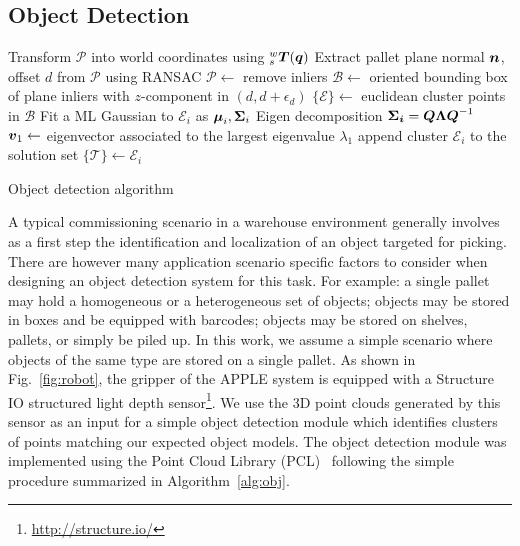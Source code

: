\subsection{Object Detection}
\label{subsec:obj_det}
%
%
\begin{algorithm}[t!]
{}
Transform $\mathcal{P}$ into world coordinates using $^w_s\mbox{\boldmath $T$}(\mbox{\boldmath $q$})$\;
 {
    Extract pallet plane normal $\mbox{\boldmath $n$}$, offset $d$ from $\mathcal{P}$ using RANSAC\;
     {$\mathcal{P} \leftarrow$ remove inliers\; }
}
$\mathcal{B} \leftarrow$ oriented bounding box of plane inliers with $z$-component in $(d,d+\epsilon_d)$\;
$\{\mathcal{E}\} \leftarrow$ euclidean cluster points in $\mathcal{B}$\;
 {
    Fit a ML Gaussian to $\mathcal{E}_i$ as $\mbox{\boldmath $\mu$}_i,\mbox{\boldmath $\Sigma$}_i$\;
    Eigen decomposition $\mbox{\boldmath $\Sigma_i$}=\mbox{\boldmath $Q$}\mbox{\boldmath $\Lambda$}\mbox{\boldmath $Q$}^{-1}$\;
    $\mbox{\boldmath $v$}_1 \leftarrow$ eigenvector associated to the largest eigenvalue $\lambda_1$\;
     {append cluster
      $\mathcal{E}_i$ to the solution set $\{\mathcal{T}\}
      \leftarrow \mathcal{E}_i$\;}
}
\caption{Object detection algorithm}\label{alg:obj}
\end{algorithm}
%
A typical commissioning scenario in a warehouse environment generally involves as a first step the
identification and localization of an object targeted for picking. There are however many
application scenario specific factors to consider when designing an object detection system for this
task. For example: a single pallet may hold a homogeneous or a heterogeneous set of objects; objects
may be stored in boxes and be equipped with barcodes; objects may be stored on shelves, pallets, or
simply be piled up. In this work, we assume a simple scenario where objects of the same type are
stored on a single pallet. As shown in Fig.~\ref{fig:robot}, the gripper of the APPLE system is
equipped with a Structure IO structured light depth sensor\footnote{\url{http://structure.io/}}. We
use the 3D point clouds generated by this sensor as an input for a simple object detection module
which identifies clusters of points matching our expected object models. The object detection module
was implemented using the Point Cloud Library (PCL)~\cite{Rusu11} following the simple procedure
summarized in Algorithm~\ref{alg:obj}.

